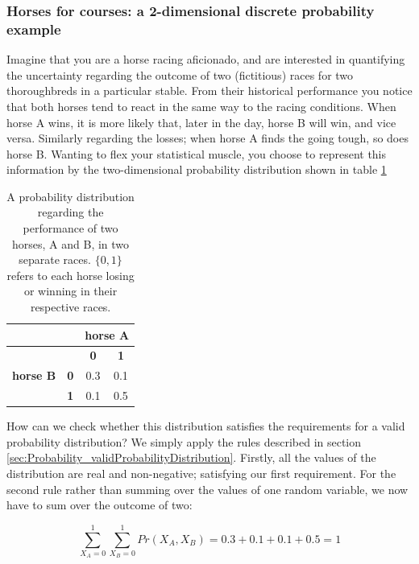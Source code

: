 \documentclass[11pt,fullpage]{book}
\begin{document}
\subsubsection{Horses for courses: a 2-dimensional discrete probability example}\label{sec:Probability_biasedCoinsTwoDimensionalDiscrete}
Imagine that you are a horse racing aficionado, and are interested in quantifying the uncertainty regarding the outcome of two (fictitious) races for two thoroughbreds in a particular stable. From their historical performance you notice that both horses tend to react in the same way to the racing conditions. When horse A wins, it is more likely that, later in the day, horse B will win, and vice versa. Similarly regarding the losses; when horse A finds the going tough, so does horse B. Wanting to flex your statistical muscle, you choose to represent this information by the two-dimensional probability distribution shown in table \ref{tab:Probability_coinBiased}

\begin{table}[htbp]
  \centering
    \begin{tabular}{rrcc}
    \toprule
          &       & \multicolumn{2}{c}{\textbf{horse A}} \\
    \midrule
          &       & \textbf{0} & \textbf{1} \\
    \multicolumn{1}{c}{\textbf{horse B}} & \multicolumn{1}{c}{\textbf{0}} & 0.3   & 0.1 \\
    \multicolumn{1}{c}{} & \multicolumn{1}{c}{\textbf{1}} & 0.1   & 0.5 \\
    \bottomrule
    \end{tabular}%
  \caption{A probability distribution regarding the performance of two horses, A and B, in two separate races. $\{0,1\}$ refers to each horse losing or winning in their respective races.}\label{tab:Probability_coinBiased}
\end{table}

How can we check whether this distribution satisfies the requirements for a valid probability distribution? We simply apply the rules described in section \ref{sec:Probability_validProbabilityDistribution}. Firstly, all the values of the distribution are real and non-negative; satisfying our first requirement. For the second rule rather than summing over the values of one random variable, we now have to sum over the outcome of two:

\begin{equation}\label{eq:Probability_discreteTwoDimensionalCoinSum}
\sum\limits_{X_A=0}^{1}\sum\limits_{X_B=0}^{1} Pr(X_A,X_B) = 0.3 + 0.1 + 0.1 + 0.5 = 1
\end{equation}
\end{document}
